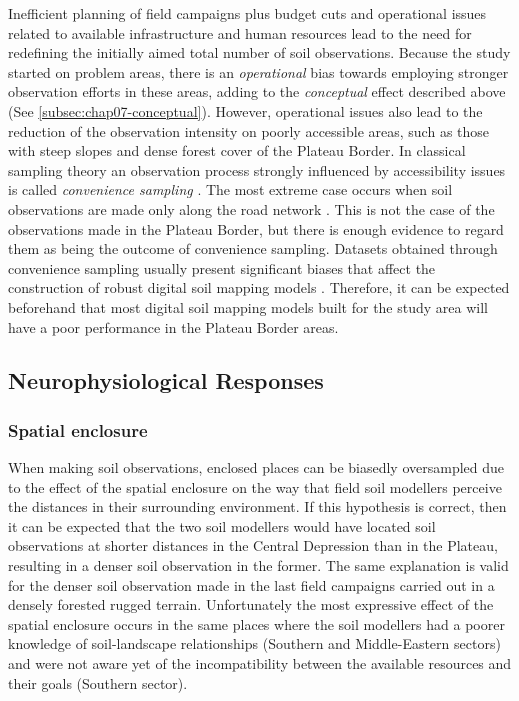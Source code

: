 Inefficient planning of field campaigns plus budget cuts and operational issues related to available 
infrastructure and human resources lead to the need for redefining the initially aimed total number of soil 
observations. Because the study started on problem areas, there is an \emph{operational} bias towards employing
stronger observation efforts in these areas, adding to the \emph{conceptual} effect described above (See 
\autoref{subsec:chap07-conceptual}). However, operational issues also lead to the reduction of the 
observation intensity on poorly accessible areas, such as those with steep slopes and dense forest cover of 
the Plateau Border. In classical sampling theory an observation process strongly influenced by accessibility 
issues is called \emph{convenience sampling} \cite{deGruijterEtAl2006}. The most extreme case occurs when soil 
observations are made only along the road network \cite{CambuleEtAl2013}. This is not the case of the 
observations made in the Plateau Border, but there is enough evidence to regard them as being the outcome of 
convenience sampling. Datasets obtained through convenience sampling usually present significant biases that 
affect the construction of robust digital soil mapping models \cite{BrusEtAl2011}. Therefore, it can be 
expected beforehand that most digital soil mapping models built for the study area will have a poor 
performance in the Plateau Border areas.

\subsection{Neurophysiological Responses}

\subsubsection{Spatial enclosure}

When making soil observations, enclosed places can be biasedly oversampled due to the effect of the spatial 
enclosure on the way that field soil modellers perceive the distances in their surrounding environment. If 
this hypothesis is correct, then it can be expected that the two soil modellers would have located soil 
observations at shorter distances in the Central Depression than in the Plateau, resulting in a denser soil 
observation in the former. The same explanation is valid for the denser soil observation made in the last field
campaigns carried out in a densely forested rugged terrain. Unfortunately the most expressive effect of the 
spatial enclosure occurs in the same places where the soil modellers had a poorer knowledge of soil-landscape 
relationships (Southern and Middle-Eastern sectors) and were not aware yet of the incompatibility between the 
available resources and their goals (Southern sector).

